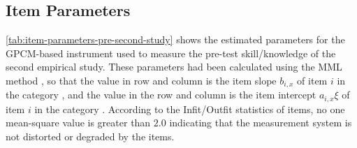 
\subsection{Item Parameters}

\autoref{tab:item-parameters-pre-second-study} shows the estimated parameters for the GPCM-based instrument used to measure the pre-test skill/knowledge of the second empirical study.
These parameters had been calculated using the MML method \cite{BockAitkin1981}, so that the value in row  and column  is the item slope $b_{i,x}$ of item $i$ in the category , and the value in the row  and column  is the item intercept $a_{i,x}\xi$ of item $i$ in the category .
According to the Infit/Outfit statistics of items, no one mean-square value is greater than $2.0$ indicating that the measurement system is not distorted or degraded by the items.

